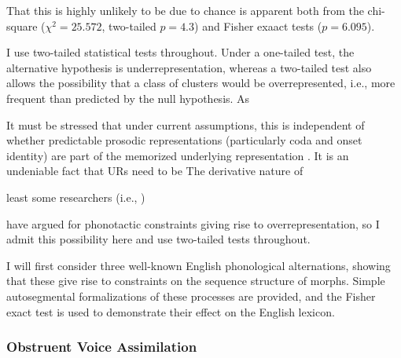 That this is highly unlikely to be due to chance is apparent both from the chi-square ($\chi^2 = 25.572$, two-tailed $p = 4.3$) and Fisher exaact tests ($p =  6.095$). 

I use two-tailed statistical tests throughout. 
Under a one-tailed test, the alternative hypothesis is underrepresentation, whereas a two-tailed test also allows the possibility that a class of clusters would be overrepresented, i.e., more frequent than predicted by the null hypothesis. As 

\citet{Pierrehumbert1994}

It must be stressed that under current assumptions, this is independent of whether predictable prosodic representations (particularly coda and onset identity) are part of the memorized underlying representation \citep[e.g.,][]{Vaux2003}.
It is an undeniable fact that URs need to be 
The derivative nature of 
\citet{Ito1989a,Noske1992}

least some researchers (i.e., \citealt{Mester1988}) 

 \citep[e.g.,]{Brown2010} have argued for phonotactic constraints giving rise to overrepresentation, so I admit this possibility here and use two-tailed tests throughout. 





I will first consider three well-known English phonological alternations, showing that these give rise to constraints on the sequence structure of morphs. Simple autosegmental formalizations of these processes are provided, and the Fisher exact test is used to demonstrate their effect on the English lexicon.

\subsubsection{Obstruent Voice Assimilation}


